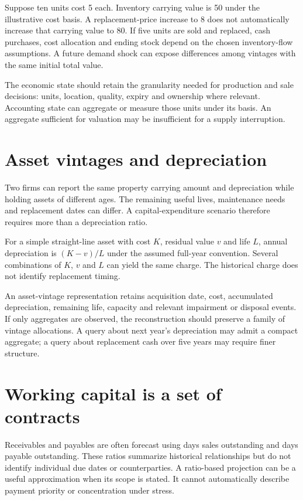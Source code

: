 Suppose ten units cost 5 each. Inventory carrying value is 50 under the illustrative cost basis. A replacement-price increase to 8 does not automatically increase that carrying value to 80. If five units are sold and replaced, cash purchases, cost allocation and ending stock depend on the chosen inventory-flow assumptions. A future demand shock can expose differences among vintages with the same initial total value.

The economic state should retain the granularity needed for production and sale decisions: units, location, quality, expiry and ownership where relevant. Accounting state can aggregate or measure those units under its basis. An aggregate sufficient for valuation may be insufficient for a supply interruption.

\section{Asset vintages and depreciation}
Two firms can report the same property carrying amount and depreciation while holding assets of different ages. The remaining useful lives, maintenance needs and replacement dates can differ. A capital-expenditure scenario therefore requires more than a depreciation ratio.

For a simple straight-line asset with cost $K$, residual value $v$ and life $L$, annual depreciation is $(K-v)/L$ under the assumed full-year convention. Several combinations of $K$, $v$ and $L$ can yield the same charge. The historical charge does not identify replacement timing.

An asset-vintage representation retains acquisition date, cost, accumulated depreciation, remaining life, capacity and relevant impairment or disposal events. If only aggregates are observed, the reconstruction should preserve a family of vintage allocations. A query about next year's depreciation may admit a compact aggregate; a query about replacement cash over five years may require finer structure.

\section{Working capital is a set of contracts}
Receivables and payables are often forecast using days sales outstanding and days payable outstanding. These ratios summarize historical relationships but do not identify individual due dates or counterparties. A ratio-based projection can be a useful approximation when its scope is stated. It cannot automatically describe payment priority or concentration under stress.

